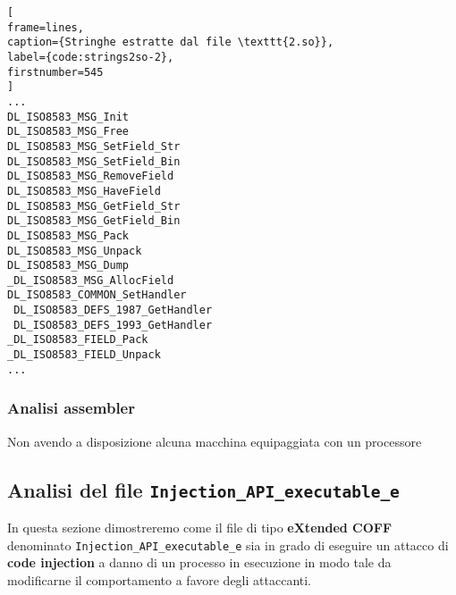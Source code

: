 \documentclass[10pt,a4paper, titlepage]{report}
\begin{document}
\begin{lstlisting}[
frame=lines, 
caption={Stringhe estratte dal file \texttt{2.so}}, 
label={code:strings2so-2},
firstnumber=545
]
...
DL_ISO8583_MSG_Init
DL_ISO8583_MSG_Free
DL_ISO8583_MSG_SetField_Str
DL_ISO8583_MSG_SetField_Bin
DL_ISO8583_MSG_RemoveField
DL_ISO8583_MSG_HaveField
DL_ISO8583_MSG_GetField_Str
DL_ISO8583_MSG_GetField_Bin
DL_ISO8583_MSG_Pack
DL_ISO8583_MSG_Unpack
DL_ISO8583_MSG_Dump
_DL_ISO8583_MSG_AllocField
DL_ISO8583_COMMON_SetHandler
 DL_ISO8583_DEFS_1987_GetHandler
 DL_ISO8583_DEFS_1993_GetHandler
_DL_ISO8583_FIELD_Pack
_DL_ISO8583_FIELD_Unpack
...
\end{lstlisting}

\subsubsection{Analisi assembler}

Non avendo a disposizione alcuna macchina equipaggiata con un processore 



\newpage

\subsection{Analisi del file \texttt{Injection\_API\_executable\_e}}

In questa sezione dimostreremo come il file di tipo \textbf{eXtended COFF} denominato \texttt{Injection\_API\_executable\_e} sia in grado di eseguire un attacco di \textbf{code injection} a danno di un processo in esecuzione in modo tale da modificarne il comportamento a favore degli attaccanti. 
\end{document}

